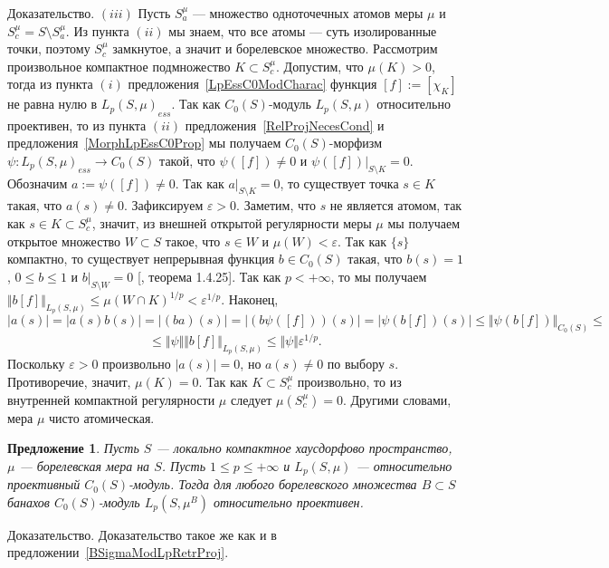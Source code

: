 \documentclass[12pt]{article}
\numberwithin{equation}{subsection}
\theoremstyle{plain}
\newtheorem{proposition}{Предложение}
\newenvironment{proof}{Доказательство.}{}
\begin{document}
\begin{fulltext}
\begin{proof}
        $(iii)$ Пусть $S_a^\mu$ --- множество одноточечных атомов меры $\mu$ и
        $S_c^\mu=S\setminus S_a^\mu$. Из пункта $(ii)$ мы знаем, что все атомы
        --- суть изолированные точки, поэтому $S_c^\mu$ замкнутое, а значит и
        борелевское множество. Рассмотрим произвольное компактное подмножество
        $K\subset S_c^\mu$. Допустим, что $\mu(K)>0$, тогда из пункта $(i)$
        предложения~\ref{LpEssC0ModCharac} функция $[f]:=[\chi_K]$ не равна нулю
        в ${L_p(S,\mu)}_{ess}$. Так как $C_0(S)$-модуль $L_p(S, \mu)$
        относительно проективен, то из пункта $(ii)$
        предложения~\ref{RelProjNecesCond} и предложения~\ref{MorphLpEssC0Prop}
        мы получаем $C_0(S)$-морфизм $\psi:{L_p(S,\mu)}_{ess}\to C_0(S)$ такой,
        что $\psi([f])\neq 0$ и $\psi([f])|_{S\setminus K}=0$. Обозначим
        $a:=\psi([f])\neq 0$. Так как $a|_{S\setminus K}=0$, то существует точка
        $s\in K$ такая, что $a(s)\neq 0$. Зафиксируем $\varepsilon > 0$.
        Заметим, что $s$ не является атомом, так как $s\in K\subset S_c^\mu$,
        значит, из внешней открытой регулярности меры $\mu$ мы получаем открытое
        множество $W\subset S$ такое, что $s\in W$ и $\mu(W)<\varepsilon$. Так
        как $\{s\}$ компактно, то существует непрерывная функция $b\in C_0(S)$
        такая, что $b(s)=1$, $0\leq b\leq 1$ и $b|_{S\setminus W}=0$
        [\cite{DalesBanSpContFunDualSp}, теорема 1.4.25]. Так как $p<+\infty$,
        то мы получаем $\Vert b[f]\Vert_{L_p(S,\mu)} \leq {\mu(W\cap
                K)}^{1/p}<\varepsilon^{1/p}$. Наконец,
        $$
            |a(s)|=|a(s)b(s)|=|(ba)(s)|=|(b\psi([f]))(s)|
            =|\psi(b[f])(s)|\leq\Vert \psi (b[f])\Vert_{C_0(S)}\leq
        $$
        $$
            \leq\Vert\psi\Vert\Vert b[f]\Vert_{L_p(S,\mu)}
            \leq\Vert\psi\Vert\varepsilon^{1/p}.
        $$
        Поскольку $\varepsilon>0$ произвольно $|a(s)|=0$, но $a(s)\neq 0$ по
        выбору $s$. Противоречие, значит, $\mu(K)=0$. Так как $K\subset S_c^\mu$
        произвольно, то из внутренней компактной регулярности $\mu$ следует
        $\mu(S_c^\mu)=0$. Другими словами, мера $\mu$ чисто атомическая.
    \end{proof}

    \begin{proposition}\label{C0ModLpRetrProj} Пусть $S$ --- локально компактное
        хаусдорфово пространст\-во, $\mu$ --- борелевская мера на $S$. Пусть
        $1\leq p\leq +\infty$ и $L_p(S,\mu)$ --- относительно проективный
        $C_0(S)$-модуль. Тогда для любого борелевского множества $B\subset S$
        банахов $C_0(S)$-модуль $L_p(S,\mu^B)$ относительно проективен.
    \end{proposition}
    \begin{proof} Доказательство такое же как и в
        предложении~\ref{BSigmaModLpRetrProj}.
    \end{proof}


\end{fulltext}
\end{document}
